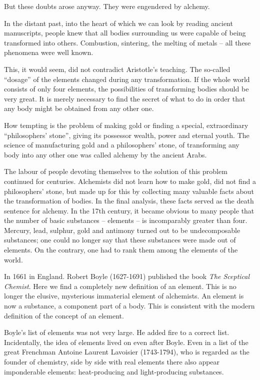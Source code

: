 But these doubts arose anyway. They were engendered by alchemy.

In the distant past, into the heart of which we can look by reading ancient manuscripts, people knew that all bodies surrounding us were capable of being trans­formed into others. Combustion, sintering, the melting of metals -- all these phenomena were well known.

This, it would seem, did not contradict Aristotle’s teaching. The so-called ``dosage'' of the elements changed during any transformation. If the whole world consists of only four elements, the possibilities of transforming bodies should be very great. It is merely necessary to find the secret of what to do in order that any body might be obtained from any other one.

How tempting is the problem of making gold or find­ing a special, extraordinary ``philosophers' stone'', giving its possessor wealth, power and eternal youth. The science of manufacturing gold and a philosophers' stone, of transforming any body into any other one was called alchemy by the ancient Arabs.

The labour of people devoting themselves to the so­lution of this problem continued for centuries. Alchemists did not learn how to make gold, did not find a philos­ophers' stone, but made up for this by collecting many valuable facts about the transformation of bodies. In the final analysis, these facts served as the death sentence for alchemy. In the 17th century, it became ob­vious to many people that the number of basic substances -- elements -- is incomparably greater than four. Mercury, lead, sulphur, gold and antimony turned out to be undecomposable substances; one could no longer say that these substances were made out of elements. On the contrary, one had to rank them among the ele­ments of the world.

In 1661 in England. Robert Boyle (1627-1691) pub­lished the book \emph{The Sceptical Chemist}. Here we find a completely new definition of an element. This is no longer the elusive, mysterious immaterial element of alchemists. An element is now a substance, a component part of a body. This is consistent with the modern def­inition of the concept of an element.

Boyle's list of elements was not very large. He added fire to a correct list. Incidentally, the idea of elements lived on even after Boyle. Even in a list of the great Frenchman Antoine Laurent Lavoisier (1743-1794), who is regarded as the founder of chemistry, side by side with real elements there also appear imponderable elements: heat-producing and light-producing substances.


